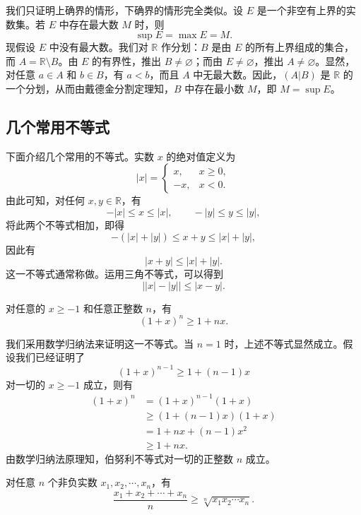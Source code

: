 \documentclass[UTF8,12pt,a4paper,fontset=fandol]{ctexbook}
\begin{document}
\noindent{}\quad 我们只证明上确界的情形，下确界的情形完全类似。设 $E$ 是一个非空有上界的实数集。若 $E$ 中存在最大数 $M$ 时，则
\[
  \sup E=\max E=M.
\]
现假设 $E$ 中没有最大数。我们对 $\mathbb{R}$ 作分划：$B$ 是由 $E$ 的所有上界组成的集合，而 $A=\mathbb{R}\setminus B$。由 $E$ 的有界性，推出 $B\ne\varnothing$；而由 $E\ne\varnothing$，推出 $A\ne\varnothing$。显然，对任意 $a\in A$ 和 $b\in B$，有 $a<b$，而且 $A$ 中无最大数。因此，$(A|B)$ 是 $\mathbb{R}$ 的一个分划，从而由戴德金分割定理知，$B$ 中存在最小数 $M$，即 $M=\sup E$。

\subsection{几个常用不等式}

下面介绍几个常用的不等式。实数 $x$ 的绝对值定义为
\[
  |x|=\begin{cases}
    x, & x\ge0,\\
    -x, & x<0.
  \end{cases}
\]
由此可知，对任何 $x,y\in\mathbb{R}$，有
\[
  -|x|\le x\le |x|,\qquad -|y|\le y\le |y|,
\]
将此两个不等式相加，即得
\[
  -(|x|+|y|)\le x+y\le |x|+|y|,
\]
因此有
\[
  |x+y|\le |x|+|y|.
\]
这一不等式通常称做。运用三角不等式，可以得到
\[
  \bigl||x|-|y|\bigr|\le |x-y|.
\]

\noindent{}\quad 对任意的 $x\ge -1$ 和任意正整数 $n$，有
\[
  (1+x)^n\ge 1+nx.
\]

\noindent{}\quad 我们采用数学归纳法来证明这一不等式。当 $n=1$ 时，上述不等式显然成立。假设我们已经证明了
\[
  (1+x)^{n-1}\ge 1+(n-1)x
\]
对一切的 $x\ge -1$ 成立，则有
\[
\begin{aligned}
  (1+x)^n
  &= (1+x)^{n-1}(1+x)\\
  &\ge (1+(n-1)x)(1+x)\\
  &=1+nx+(n-1)x^2\\
  &\ge 1+nx.
\end{aligned}
\]
由数学归纳法原理知，伯努利不等式对一切的正整数 $n$ 成立。

\noindent{}\quad 对任意 $n$ 个非负实数 $x_1,x_2,\cdots,x_n$，有
\[
  \frac{x_1+x_2+\cdots+x_n}{n}\ge \sqrt[n]{x_1x_2\cdots x_n}.
\]
\end{document}
